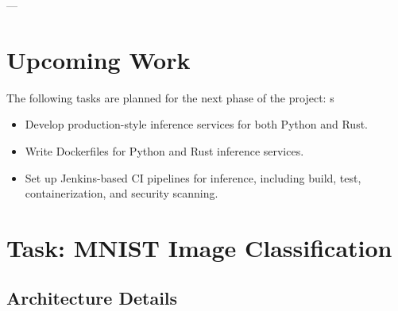 \documentclass[10pt,a4paper,twocolumn]{article}
\begin{document}
---

\section{Upcoming Work}

The following tasks are planned for the next phase of the project:
s
\begin{itemize}
    \item Develop production-style inference services for both Python and Rust.
    \item Write Dockerfiles for Python and Rust inference services.
    \item Set up Jenkins-based CI pipelines for inference, including build, test, containerization, and security scanning.
\end{itemize}

\clearpage

\section{Task: MNIST Image Classification}
\subsection{Architecture Details}
\end{document}
